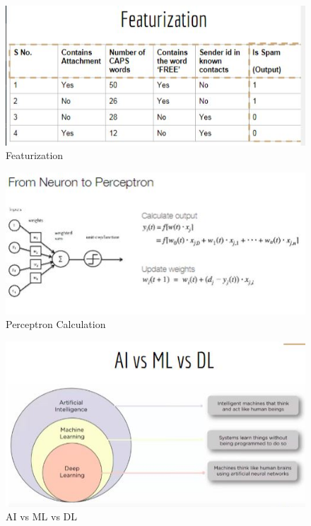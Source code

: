 \documentclass{article}
\begin{document}
\begin{figure}[htp]
\centering
\includegraphics[width=15cm]{images/featurization.JPG}
\caption{Featurization}
\label{fig: featurization}
\end{figure}

\begin{figure}[htp]
\centering
\includegraphics[width=15cm]{images/feedforwardcalc.JPG}
\caption{Perceptron Calculation}
\label{fig: calc}
\end{figure}

\begin{figure}[htp]
\centering
\includegraphics[width=15cm]{images/AIMLDL.JPG}
\caption{AI vs ML vs DL}
\label{fig: aimldl}
\end{figure}
\end{document}
